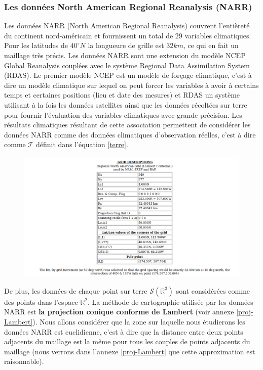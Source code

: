 \documentclass[a4paper,11pt]{article}
\numberwithin{equation}{section}
\begin{document}
\subsubsection{Les données North American Regional Reanalysis (NARR)}
\label{ch:NARR}

Les données NARR (North American Regional Reanalysis) couvrent l'entièreté du continent nord-américain et fournissent un total de $29$ variables climatiques. Pour les latitudes de $40^{\circ} N$ la longueure de grille est $32km$, ce qui en fait un maillage très précis. Les données NARR sont une extension du modèle NCEP Global Reanalysis couplées avec le système Regional Data Assimilation System (RDAS). Le premier modèle NCEP est un modèle de forçage climatique, c'est à dire un modèle climatique sur lequel on peut forcer les variables à avoir à certains temps et certaines positions (lieu et date des mesures) et RDAS un système utilisant à la fois les données satellites ainsi que les données récoltées sur terre pour fournir l'évaluation des variables climatiques avec grande précision. Les résultats climatiques résultant de cette association permettent de considérer les données NARR comme des données climatiques d'observation réelles, c'est à dire comme $\mathcal{T}$ définit dans l'équation \eqref{terre}. 

\begin{figure}[H]
	\begin{center}
		\includegraphics[scale=0.4]{grid_prop.png}
	\end{center}
	\label{fig-maillage NARR}
\end{figure}

De plus, les données de chaque point sur terre $\mathcal{S}(\mathbb{R}^3)$ sont considérées comme des points dans l'espace $\mathbb{R}^2$. La méthode de cartographie utilisée par les données NARR est \textbf{la projection conique conforme de Lambert} (voir annexe \ref{proj-Lambert}). Nous allons considérer que la zone sur laquelle nous étudierons les données NARR est euclidienne, c'est à dire que la distance entre deux points adjacents du maillage est la même pour tous les couples de points adjacents du maillage (nous verrons dans l'annexe \ref{proj-Lambert} que cette approximation est raisonnable).
\end{document}
